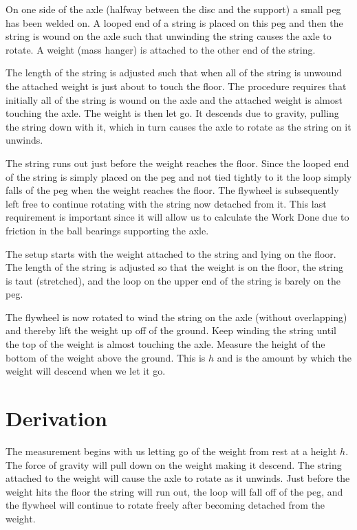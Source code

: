     \diag

    On one side of the axle (halfway between the disc and the support) a small peg has been welded on. A looped end of a string is placed on this peg and then the string is wound on the axle such that unwinding the string causes the axle to rotate. A weight (mass hanger) is attached to the other end of the string.

    The length of the string is adjusted such that when all of the string is unwound the attached weight is just about to touch the floor. The procedure requires that initially all of the string is wound on the axle and the attached weight is almost touching the axle. The weight is then let go. It descends due to gravity, pulling the string down with it, which in turn causes the axle to rotate as the string on it unwinds.

    The string runs out just before the weight reaches the floor. Since the looped end of the string is simply placed on the peg and not tied tightly to it the loop simply falls of the peg when the weight reaches the floor. The flywheel is subsequently left free to continue rotating with the string now detached from it. This last requirement is important since it will allow us to calculate the Work Done due to friction in the ball bearings supporting the axle.

    The setup starts with the weight attached to the string and lying on the floor. The length of the string is adjusted so that the weight is on the floor, the string is taut (stretched), and the loop on the upper end of the string is barely on the peg.

    The flywheel is now rotated to wind the string on the axle (without overlapping) and thereby lift the weight up off of the ground. Keep winding the string until the top of the weight is almost touching the axle. Measure the height of the bottom of the weight above the ground. This is $h$ and is the amount by which the weight will descend when we let it go.

\section{Derivation}

    The measurement begins with us letting go of the weight from rest at a height $h$. The force of gravity will pull down on the weight making it descend. The string attached to the weight will cause the axle to rotate as it unwinds. Just before the weight hits the floor the string will run out, the loop will fall off of the peg, and the flywheel will continue to rotate freely after becoming detached from the weight.

